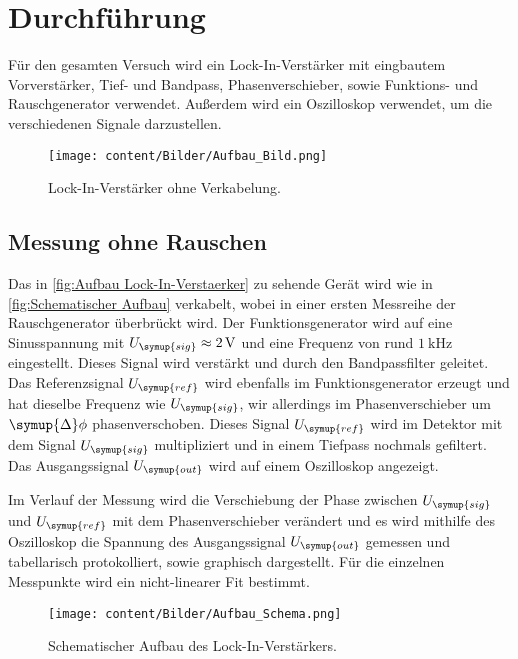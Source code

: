 \section{Durchführung}
\label{sec:Durchfuehrung}
Für den gesamten Versuch wird ein Lock-In-Verstärker mit eingbautem Vorverstärker, Tief- und Bandpass, Phasenverschieber,
sowie Funktions- und Rauschgenerator verwendet. Außerdem wird ein Oszilloskop verwendet, um die verschiedenen Signale darzustellen.

\begin{figure} [H]
    \centering
    \texttt{[image: content/Bilder/Aufbau\_Bild.png]}
    \caption{Lock-In-Verstärker ohne Verkabelung.\cite{v303}}
    \label{fig:Aufbau Lock-In-Verstaerker}
\end{figure}

\subsection{Messung ohne Rauschen}
\label{sec:Messung ohne Rauschen}
Das in \autoref{fig:Aufbau Lock-In-Verstaerker} zu sehende Gerät wird wie in \autoref{fig:Schematischer Aufbau} verkabelt, 
wobei in einer ersten Messreihe der Rauschgenerator überbrückt wird. Der Funktionsgenerator wird auf eine Sinusspannung mit 
$U_{\symup{sig}}\approx\qty{2}{\volt}$ und eine Frequenz von rund $\qty{1}{\kilo\hertz}$ eingestellt. Dieses Signal wird 
verstärkt und durch den Bandpassfilter geleitet. Das Referenzsignal $U_{\symup{ref}}$ wird ebenfalls im Funktionsgenerator 
erzeugt und hat dieselbe Frequenz wie $U_{\symup{sig}}$, wir allerdings im Phasenverschieber um $\symup{\Delta}\phi$ 
phasenverschoben. Dieses Signal $U_{\symup{ref}}$ wird im Detektor mit dem Signal $U_{\symup{sig}}$ multipliziert und in einem
Tiefpass nochmals gefiltert. Das Ausgangssignal $U_{\symup{out}}$ wird auf einem Oszilloskop angezeigt.

Im Verlauf der Messung wird die Verschiebung der Phase zwischen $U_{\symup{sig}}$ und $U_{\symup{ref}}$ mit dem Phasenverschieber
verändert und es wird mithilfe des Oszilloskop die Spannung des Ausgangssignal $U_{\symup{out}}$ gemessen und tabellarisch
protokolliert, sowie graphisch dargestellt. Für die einzelnen Messpunkte wird ein nicht-linearer Fit bestimmt.

\begin{figure} [H]
    \centering
    \texttt{[image: content/Bilder/Aufbau\_Schema.png]}
    \caption{Schematischer Aufbau des Lock-In-Verstärkers.\cite{v303}}
    \label{fig:Schematischer Aufbau}
\end{figure}

